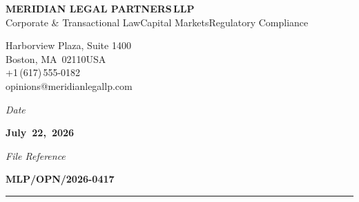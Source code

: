 \documentclass[11pt,a4paper]{scrartcl}
\begin{document}
\pagestyle{scrheadings}


\vspace*{-14mm}
\noindent
\begin{minipage}[t]{0.55\textwidth}
  \vspace{4mm}
  {\color{white}\fontsize{17}{20}\selectfont\textbf{MERIDIAN LEGAL PARTNERS}\,\textcolor{GoldAccent}{\textbf{LLP}}}\\[1.5mm]
  {\color{white!75!NavyDeep}\small Corporate \& Transactional Law\enspace\textbullet\enspace Capital Markets\enspace\textbullet\enspace Regulatory Compliance}
\end{minipage}%
\hfill
\begin{minipage}[t]{0.38\textwidth}
  \vspace{4mm}
  \RaggedLeft
  {\color{white}\small
    \faBuilding{} Harborview Plaza, Suite 1400\\
    Boston, MA~02110\quad USA\\[1mm]
    \faPhone\enspace +1\,(617)\,555-0182\\
    \faEnvelope\enspace opinions@meridianlegallp.com
  }
\end{minipage}

\vspace{16mm}

\noindent
\begin{minipage}[t]{0.48\textwidth}
  {\color{SlateGray}\small\faCalendar\enspace\textit{Date}}\par
  {\color{NavyDeep}\bfseries July~22,~2026}
\end{minipage}%
\hfill
\begin{minipage}[t]{0.48\textwidth}
  \RaggedLeft
  {\color{SlateGray}\small\faFile\enspace\textit{File Reference}}\par
  {\color{NavyDeep}\bfseries MLP/OPN/2026-0417}
\end{minipage}

\vspace{4mm}
{\color{RuleGray}\rule{\textwidth}{0.6pt}}
\vspace{6mm}
\end{document}
